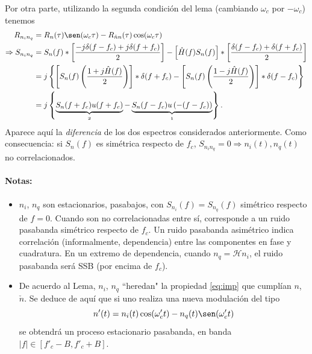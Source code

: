 \noindent Por otra parte, utilizando la segunda condición del lema (cambiando
$\omega_c$ por $-\omega_c$) tenemos
\begin{align*}
    R_{n_in_q} & =R_n(\tau)\sen(\omega_c\tau)-R_{\check{n}n}(\tau)\cos(\omega_c\tau)\\
    \Rightarrow %
                    S_{n_in_q}  & = S_n(f) \ast \left[\frac{-j\delta(f-f_c)+j\delta(f+f_c)}{2}\right] - \left[\hat{H}(f)S_n(f)\right] \ast \left[\frac{\delta(f-f_c)+\delta(f+f_c)}{2}\right]\\
                            & = j \left\lbrace\left[S_n(f)\left(\frac{1+j\hat{H}(f)}{2}\right)\right] \ast \delta(f+f_c) - \left[S_n(f)\left(\frac{1-j\hat{H}(f)}{2}\right)\right] \ast \delta(f-f_c)\right\rbrace\\
                            & = j \left\lbrace\underbrace{S_n(f+f_c)u(f+f_c)}_{\oldstylenums{2}}-
                            \underbrace{S_n(f-f_c)u\left(-(f-f_c)\right)}_{\oldstylenums{1}}\right\rbrace.
\end{align*}
Aparece aquí la {\em diferencia} de los dos espectros
considerados anteriormente. Como consecuencia: si $S_n(f)$ es simétrica respecto de $f_c$, 
$S_{n_in_q}=0 \Rightarrow n_i(t), n_q(t)$ no correlacionados.

\paragraph{Notas:} 
\begin{itemize}
\item  $n_i$, $n_q$ son estacionarios, pasabajos, con
$S_{n_i}(f)=S_{n_q}(f)$ simétrico respecto de $f=0$. Cuando son no
correlacionadas entre sí, corresponde a un ruido pasabanda 
simétrico respecto de $f_c$. Un ruido pasabanda asimétrico indica correlación
(informalmente, dependencia) entre las componentes en fase y
cuadratura. En un extremo de dependencia, cuando
$n_q=\mathcal{H}{n_i}$, el ruido pasabanda será SSB (por encima de
$f_c$).%
\item De acuerdo al Lema, $n_i$, $n_q$
``heredan" la propiedad \eqref{eq:imp} que cumplían $n$,
$\check{n}$. Se deduce de aquí que si uno realiza una nueva modulación del tipo 
\[n'(t)=n_i(t)\cos(\omega'_ct)-n_q(t)\sen(\omega'_ct)\]
se obtendrá un proceso estacionario pasabanda, en banda
$|f|\in[f'_c-B,f'_c+B]$. 
\end{itemize}

%


